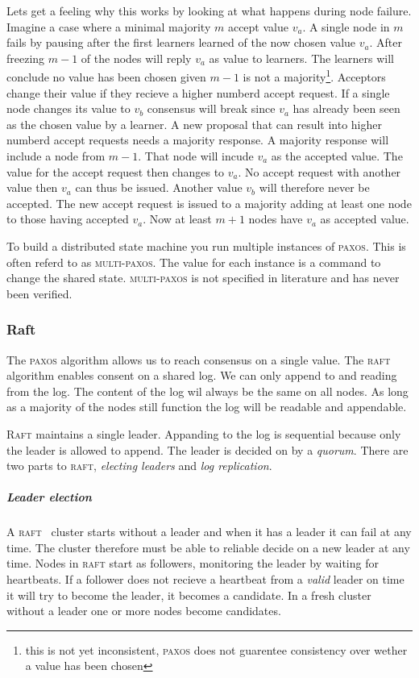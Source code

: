 Lets get a feeling why this works by looking at what happens during node failure. Imagine a case where a minimal majority $m$ accept value $v_a$. A single node in $m$ fails by pausing after the first learners learned of the now chosen value $v_a$. After freezing $m-1$ of the nodes will reply $v_a$ as value to learners. The learners will conclude no value has been chosen given $m-1$ is not a majority\footnote{this is not yet inconsistent, \textsc{paxos} does not guarentee consistency over wether a value has been chosen}. Acceptors change their value if they recieve a higher numberd accept request. If a single node changes its value to $v_b$ consensus will break since $v_a$ has already been seen as the chosen value by a learner. A new proposal that can result into higher numberd accept requests needs a majority response. A majority response will include a node from $m-1$. That node will incude $v_a$ as the accepted value. The value for the accept request then changes to $v_a$. No accept request with another value then $v_a$ can thus be issued. Another value $v_b$ will therefore never be accepted. The new accept request is issued to a majority adding at least one node to those having accepted $v_a$. Now at least $m+1$ nodes have $v_a$ as accepted value.

To build a distributed state machine you run multiple instances of \textsc{paxos}. This is often referd to as \textsc{multi-paxos}. The value for each instance is a command to change the shared state. \textsc{multi-paxos} is not specified in literature and has never been verified.

\subsubsection*{Raft}
The \textsc{paxos} algorithm allows us to reach consensus on a single value. The \textsc{raft} algorithm enables consent on a shared log. We can only append to and reading from the log. The content of the log wil always be the same on all nodes. As long as a majority of the nodes still function the log will be readable and appendable.

\textsc{Raft} maintains a single leader. Appanding to the log is sequential because only the leader is allowed to append. The leader is decided on by a \textit{quorum}. There are two parts to \textsc{raft}, \textit{electing leaders} and \textit{log replication}.

\subparagraph{Leader election} \label{sec:valid}
A \textsc{raft}~\cite{raft} cluster starts without a leader and when it has a leader it can fail at any time. The cluster therefore must be able to reliable decide on a new leader at any time. Nodes in \textsc{raft} start as followers, monitoring the leader by waiting for heartbeats. If a follower does not recieve a heartbeat from a \emph{valid} leader on time it will try to become the leader, it becomes a candidate. In a fresh cluster without a leader one or more nodes become candidates.

